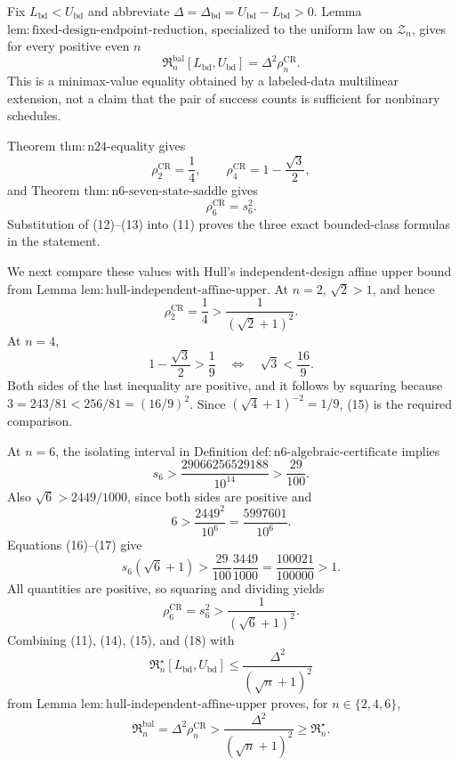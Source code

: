 Fix \(L_{\mathrm{bd}}<U_{\mathrm{bd}}\) and abbreviate \(\Delta=\Delta_{\mathrm{bd}}=U_{\mathrm{bd}}-L_{\mathrm{bd}}>0\).  Lemma \(\mathrm{lem{:}fixed\mbox{-}design\mbox{-}endpoint\mbox{-}reduction}\), specialized to the uniform law on \(\mathcal Z_n\), gives for every positive even \(n\)
\[
 \mathfrak R_n^{\mathrm{bal}}[L_{\mathrm{bd}},U_{\mathrm{bd}}]
 =\Delta^2\rho_n^{\mathrm{CR}}. \tag{11}
\]
This is a minimax-value equality obtained by a labeled-data multilinear extension, not a claim that the pair of success counts is sufficient for nonbinary schedules.

Theorem \(\mathrm{thm{:}n24\mbox{-}equality}\) gives
\[
 \rho_2^{\mathrm{CR}}=\frac14,
 \qquad
 \rho_4^{\mathrm{CR}}=1-\frac{\sqrt3}{2}, \tag{12}
\]
and Theorem \(\mathrm{thm{:}n6\mbox{-}seven\mbox{-}state\mbox{-}saddle}\) gives
\[
 \rho_6^{\mathrm{CR}}=s_6^2. \tag{13}
\]
Substitution of (12)--(13) into (11) proves the three exact bounded-class formulas in the statement.

We next compare these values with Hull's independent-design affine upper bound from Lemma \(\mathrm{lem{:}hull\mbox{-}independent\mbox{-}affine\mbox{-}upper}\).  At \(n=2\), \(\sqrt2>1\), and hence
\[
 \rho_2^{\mathrm{CR}}=\frac14>\frac1{(\sqrt2+1)^2}. \tag{14}
\]
At \(n=4\),
\[
 1-\frac{\sqrt3}{2}>\frac19
 \quad\Longleftrightarrow\quad
 \sqrt3<\frac{16}{9}. \tag{15}
\]
Both sides of the last inequality are positive, and it follows by squaring because
\(
 3=243/81<256/81=(16/9)^2
\).  Since \((\sqrt4+1)^{-2}=1/9\), (15) is the required comparison.

At \(n=6\), the isolating interval in Definition \(\mathrm{def{:}n6\mbox{-}algebraic\mbox{-}certificate}\) implies
\[
 s_6>\frac{29066256529188}{10^{14}}>\frac{29}{100}. \tag{16}
\]
Also \(\sqrt6>2449/1000\), since both sides are positive and
\[
 6>\frac{2449^2}{10^6}=\frac{5997601}{10^6}. \tag{17}
\]
Equations (16)--(17) give
\[
 s_6(\sqrt6+1)>
 \frac{29}{100}\frac{3449}{1000}
 =\frac{100021}{100000}>1.
\]
All quantities are positive, so squaring and dividing yields
\[
 \rho_6^{\mathrm{CR}}=s_6^2>\frac1{(\sqrt6+1)^2}. \tag{18}
\]
Combining (11), (14), (15), and (18) with
\[
 \mathfrak R_n^\star[L_{\mathrm{bd}},U_{\mathrm{bd}}]
 \leq\frac{\Delta^2}{(\sqrt n+1)^2}
\]
from Lemma \(\mathrm{lem{:}hull\mbox{-}independent\mbox{-}affine\mbox{-}upper}\) proves, for \(n\in\{2,4,6\}\),
\[
 \mathfrak R_n^{\mathrm{bal}}
 =\Delta^2\rho_n^{\mathrm{CR}}
 >\frac{\Delta^2}{(\sqrt n+1)^2}
 \geq\mathfrak R_n^\star. \tag{19}
\]

